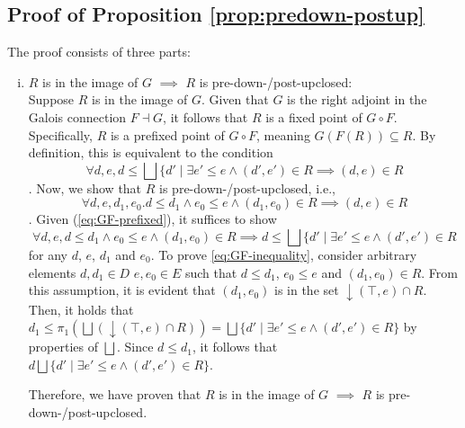 \documentclass{llncs}
\newcommand{\bigjoin}{\bigsqcup}
\newcommand{\comp}{\circ}
\begin{document}
\subsection{Proof of Proposition \ref{prop:predown-postup}}
The proof consists of three parts:
\begin{enumerate}[i.]
\item{$R$ is in the image of $G$ $\implies$ $R$ is pre-down-/post-upclosed:}\\
  Suppose $R$ is in the image of $G$.
  Given that $G$ is the right adjoint in the Galois connection $F \dashv G$, it follows that $R$ is a fixed point of $G \comp F$. Specifically, $R$ is a prefixed point of $G \comp F$, meaning $G(F(R)) \subseteq R$. By definition, this is equivalent to the condition
  \begin{equation}
    \forall d, e, d \leq \bigjoin \{ d' \mid \exists e' \leq e \land (d', e') \in R \implies (d , e) \in R \label{eq:GF-prefixed}
  \end{equation}.
  Now, we show that $R$ is pre-down-/post-upclosed, i.e.,
  \begin{equation}
   \forall d, e, d_{1 }, e_{0}.d \leq d_{1} \land e_{0} \leq e \land (d_{1}, e_{0}) \in R \implies (d, e) \in R
   \label{eq:GF-pre-post}
  \end{equation}.
  Given (\ref{eq:GF-prefixed}), it suffices to show
  \begin{equation}
    \forall d, e, d \leq d_{1} \land e_{0} \leq e \land (d_{1}, e_{0}) \in R \implies d \leq \bigjoin \{ d' \mid \exists e' \leq e \land (d', e') \in R \label{eq:GF-inequality}
  \end{equation} for any $d$, $e$, $d_{1}$ and $e_{0}$.  To prove \ref{eq:GF-inequality}, consider arbitrary elements $d, d_{1} \in D$ $e, e_{0} \in E$ such that $d \leq d_{1}$, $e_{0} \leq e$ and $(d_{1}, e_{0}) \in R$.
  From this assumption, it is evident that $(d_{1} , e_{0})$ is in the set $\downarrow (\top , e) \cap R$.
  Then, it holds that $d_{1}  \leq \pi_{1} (\bigjoin (\downarrow (\top , e) \cap R)) = \bigjoin \{ d' \mid \exists e' \leq e \land (d', e') \in R \}$ by properties of $\bigjoin$. Since $d \leq d_{1}$, it follows that $d \bigjoin \{ d' \mid \exists e' \leq e \land (d', e') \in R \}$.

  Therefore, we have proven that $R$ is in the image of $G$ $\implies$ $R$ is pre-down-/post-upclosed.


\end{enumerate}
\end{document}
